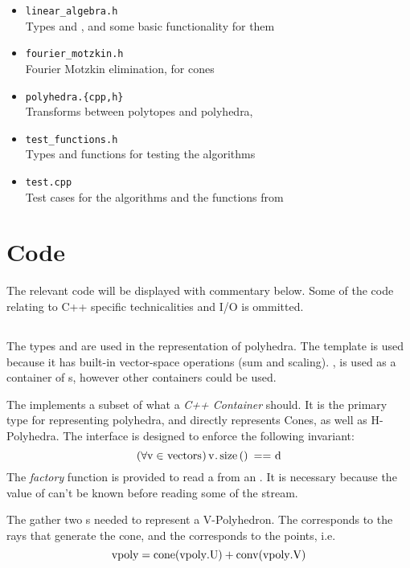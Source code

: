 \begin{itemize}
	\item \texttt{linear\_algebra.h} \\
	      Types  and , and some basic functionality for them
	\item \texttt{fourier\_motzkin.h} \\
	      Fourier Motzkin elimination, {\MWT} for cones
	\item \texttt{polyhedra.\{cpp,h\} } \\
	      Transforms between polytopes and polyhedra, {\MWT}
	\item \texttt{test\_functions.h} \\
	      Types and functions for testing the algorithms
	\item \texttt{test.cpp} \\
	      Test cases for the algorithms and the functions from 
\end{itemize}

\section{Code}

The relevant code will be displayed with commentary below.  Some of the code relating to C{++} specific technicalities and I/O is ommitted.

\subsection{}
The types  and  are used in the representation of polyhedra.  The  template is used because it has built-in vector-space operations (sum and scaling).  , is used as a container of s, however other containers could be used.
\lsttdVecs

The  implements a subset of what a \textit{C++ Container} should.  It is the primary type for representing polyhedra, and directly represents Cones, as well as H-Polyhedra.  The interface is designed to enforce the following invariant:
\[ (\forall \mli{v} \in \mli{vectors})\, \mli{v.size() == d} \]
The \textit{factory} function  is provided to read a  from an .  It is necessary because the value of  can't be known before reading some of the stream.
\lstMatrix

The  gather two s needed to represent a V-Polyhedron.  The  corresponds to the rays that generate the cone, and the  corresponds to the points, i.e.
\[ \mli{vpoly} = \cone(\mli{vpoly.U}) + \conv(\mli{vpoly.V}) \]
\lstVPoly

